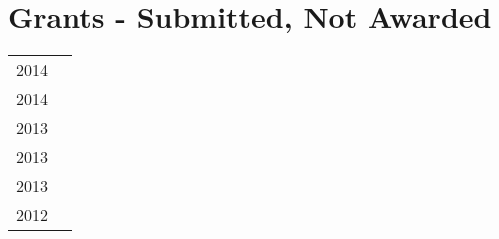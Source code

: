 \section*{Grants - Submitted, Not Awarded}
\begin{tabular}{L!{\VRule}R}
2014&\\
2014&\\
2013&\\
2013&\\
2013&\\
2012&\\
\end{tabular}